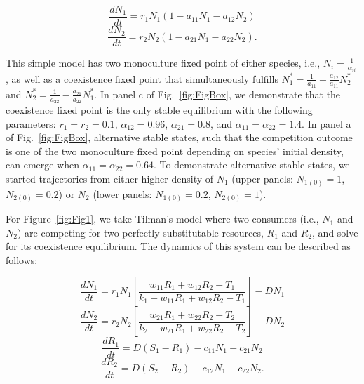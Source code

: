 \begin{equation}
\frac{dN_{1}}{dt}=r_{1}N_{1}\left ( 1-a_{11}N_{1}-a_{12}N_{2} \right )
\tag{S3.1.1}\label{eq:S3.1.1}
\end{equation}
\begin{equation}
\frac{dN_{2}}{dt}=r_{2}N_{2}\left ( 1-a_{21}N_{1}-a_{22}N_{2} \right ). 
\tag{S3.1.2}\label{eq:S3.1.2}
\end{equation}

\noindent This simple model has two monoculture fixed point of either species, i.e., $N_{i} = \frac{1}{\alpha_{ii}}$, as well as a coexistence fixed point that simultaneously fulfills  $N_{1}^{*}=\frac{1}{a_{11}}-\frac{a_{12}}{a_{11}}N_{2}^{*}$ and $N_{2}^{*}=\frac{1}{a_{22}}-\frac{a_{21}}{a_{22}}N_{1}^{*}$. In panel c of Fig.~\ref{fig:FigBox}, we demonstrate that the coexistence fixed point is the only stable equilibrium with the following parameters: $r_{1} = r_{2} = 0.1$, $\alpha_{12} = 0.96$, $\alpha_{21} = 0.8$, and $\alpha_{11} = \alpha_{22} = 1.4$. In panel a of Fig.~\ref{fig:FigBox}, alternative stable states, such that the competition outcome is one of the two monoculture fixed point depending on species' initial density, can emerge when $\alpha_{11} = \alpha_{22} = 0.64$. To demonstrate alternative stable states, we started trajectories from either higher density of $N_{1}$ (upper panels: $N_{1(0)}=1$, $N_{2(0)}=0.2$) or $N_{2}$ (lower panels: $N_{1(0)}=0.2$, $N_{2(0)}=1$). 
\par


For Figure~\ref{fig:Fig1}, we take Tilman's model \citep[p.~270]{tilman1982} where two consumers (i.e., $N_{1}$ and $N_{2}$) are competing for two perfectly substitutable resources, $R_{1}$ and $R_{2}$, and solve for its coexistence equilibrium. The dynamics of this system can be described as follows:

\begin{equation}
\frac{{d{N_1}}}{{dt}} = {r_1}{N_1}\left[ {\frac{{{w_{11}}{R_1} + {w_{12}}{R_2} - {T_1}}}{{{k_1} + {w_{11}}{R_1} + {w_{12}}{R_2} - {T_1}}}} \right] - D{N_1}
\tag{S3.2.1}\label{eq:S3.2.1}
\end{equation}
\begin{equation}
\frac{{d{N_2}}}{{dt}} = {r_2}{N_2}\left[ {\frac{{{w_{21}}{R_1} + {w_{22}}{R_2} - {T_2}}}{{{k_2} + {w_{21}}{R_1} + {w_{22}}{R_2} - {T_2}}}} \right] - D{N_2}
\tag{S3.2.2}\label{eq:S3.2.2}
\end{equation}
\begin{equation}
\frac{{d{R_1}}}{{dt}} = D\left( {{S_1} - {R_1}} \right) - {c_{11}}{N_1} - {c_{21}}{N_2}
\tag{S3.2.3}\label{eq:S3.2.3}
\end{equation}
\begin{equation}
\frac{{d{R_2}}}{{dt}} = D\left( {{S_2} - {R_2}} \right) - {c_{12}}{N_1} - {c_{22}}{N_2}.
\tag{S3.2.4}\label{eq:S3.2.4}
\end{equation}

